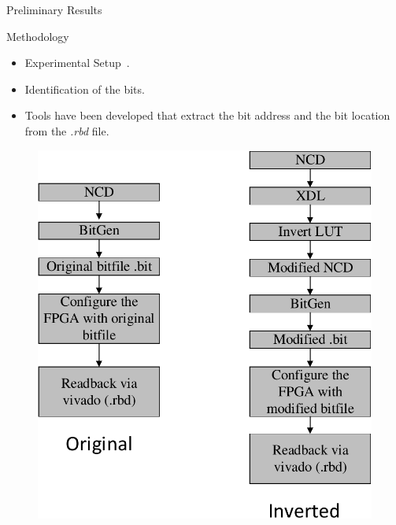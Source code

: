 \documentclass[aspectratio=1610]{beamer}
\begin{document}
\begin{frame}{Preliminary Results}

\begin{block}{Methodology}
\end{block}
\begin{itemize}

\item Experimental Setup~\citep{hobeika2014multi}.
\item Identification of the bits.
\item Tools have been developed that extract the bit address and the bit location from the \textit{.rbd} file.

\end{itemize}


\begin{figure}[tb!]
 \centering
  \captionsetup{justification=centering}    
   \includegraphics[scale=0.3]{Figures/original-inverted-rbd.pdf}
 
\end{figure}




\end{frame}
\end{document}
